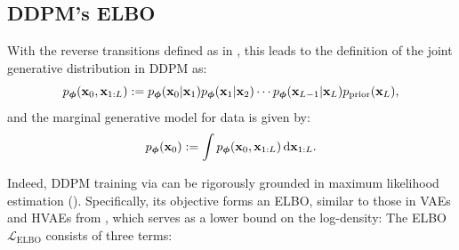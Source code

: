 \subsection{DDPM's ELBO}\label{subsec:ddpm-elbo} With the reverse transitions defined as in , this leads to the definition of the joint generative distribution in DDPM as:
\[
p_{\bm{\phi}}({\mathbf{x}}_0, {\mathbf{x}}_{1:L}) := p_{\bm{\phi}}({\mathbf{x}}_0|{\mathbf{x}}_1)  p_{\bm{\phi}}({\mathbf{x}}_1|{\mathbf{x}}_2)\cdots p_{\bm{\phi}}({\mathbf{x}}_{L-1}|{\mathbf{x}}_L)   p_{\text{prior}}({\mathbf{x}}_L),
\]
and the marginal generative model for data is given by:
\begin{align*}
    p_{\bm{\phi}}({\mathbf{x}}_0) := \int p_{\bm{\phi}}({\mathbf{x}}_0, {\mathbf{x}}_{1:L}) \mathop{}\!\mathrm{d} {\mathbf{x}}_{1:L}.
\end{align*}

Indeed, DDPM training via  can be rigorously grounded in maximum likelihood estimation (). Specifically, its objective forms an ELBO, similar to those in VAEs and HVAEs from , which serves as a lower bound on the log-density:
The ELBO $\mathcal{L}_{\text{ELBO}}$ consists of three terms:

